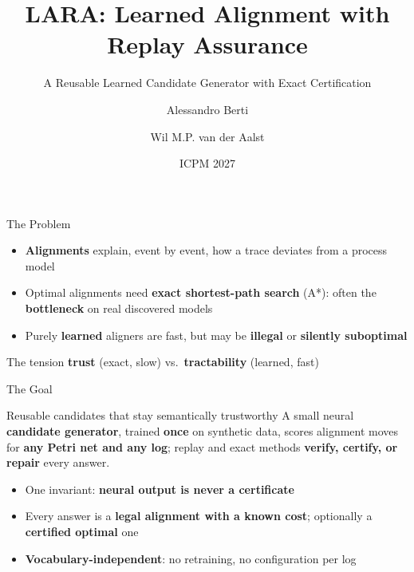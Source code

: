 \documentclass[aspectratio=169]{beamer}
\title[LARA]{\textbf{LARA}: Learned Alignment with Replay Assurance}
\subtitle{A Reusable Learned Candidate Generator with Exact Certification}
\author[Berti, van der Aalst]{Alessandro Berti \and Wil M.P. van der Aalst}
\institute[PADS, RWTH]{Process and Data Science (PADS), RWTH Aachen University}
\date{ICPM 2027}
\newcommand{\keyc}[1]{\textbf{\textcolor{larablue}{#1}}}
\newcommand{\keyg}[1]{\textbf{\textcolor{laraaqua!70!black}{#1}}}
\newcommand{\keya}[1]{\textbf{\textcolor{laraamber!85!black}{#1}}}
\begin{document}
\begin{frame}
  \titlepage
\end{frame}

\begin{frame}{The Problem}
  \begin{itemize}\setlength{\itemsep}{9pt}
    \item \keyc{Alignments} explain, event by event, how a trace deviates
      from a process model
    \item Optimal alignments need \keya{exact shortest-path search} (A*):
      often the \keya{bottleneck} on real discovered models
    \item Purely \keyc{learned} aligners are fast, but may be
      \keya{illegal} or \keya{silently suboptimal}
  \end{itemize}
  \vspace{5mm}
  \begin{block}{The tension}
    \centering \keyg{trust} (exact, slow) \quad vs.\ \quad \keyc{tractability} (learned, fast)
  \end{block}
\end{frame}

\begin{frame}{The Goal}
  \begin{block}{Reusable candidates that stay semantically trustworthy}
    A small neural \keyc{candidate generator}, trained \keyc{once} on synthetic data,
    scores alignment moves for \keyg{any Petri net and any log};
    replay and exact methods \keyg{verify, certify, or repair} every answer.
  \end{block}
  \vspace{4mm}
  \begin{itemize}\setlength{\itemsep}{7pt}
    \item One invariant: \keya{neural output is never a certificate}
    \item Every answer is a \keyg{legal alignment with a known cost};
      optionally a \keyg{certified optimal} one
    \item \keyc{Vocabulary-independent}: no retraining, no configuration per log
  \end{itemize}
\end{frame}
\end{document}
